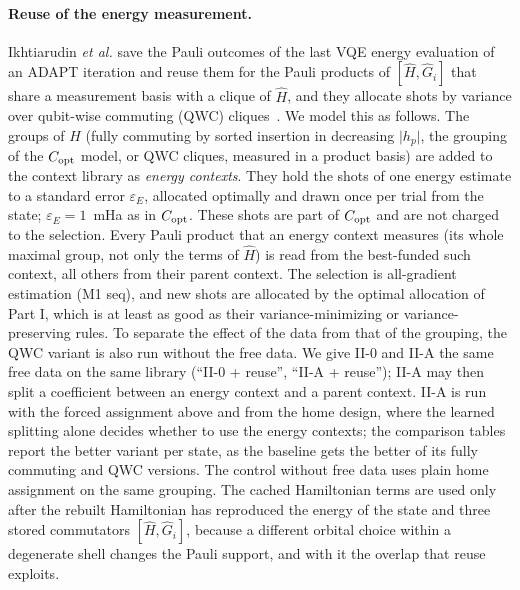 \documentclass[aps,pra,reprint,superscriptaddress,nofootinbib]{revtex4-2}
\begin{document}
\paragraph{Reuse of the energy measurement.} Ikhtiarudin \textit{et al.} save the Pauli outcomes of the last VQE energy evaluation of an ADAPT iteration and reuse them for the Pauli products of $[\hat H,\hat G_i]$ that share a measurement basis with a clique of $\hat H$, and they allocate shots by variance over qubit-wise commuting (QWC) cliques~\cite{ikhtiarudin2025}. We model this as follows. The groups of $\hat H$ (fully commuting by sorted insertion in decreasing $\lvert h_p\rvert$, the grouping of the $C_{\rm opt}$ model, or QWC cliques, measured in a product basis) are added to the context library as \emph{energy contexts}. They hold the shots of one energy estimate to a standard error $\varepsilon_E$, allocated optimally and drawn once per trial from the state; $\varepsilon_E=1$~mHa as in $C_{\rm opt}$. These shots are part of $C_{\rm opt}$ and are not charged to the selection. Every Pauli product that an energy context measures (its whole maximal group, not only the terms of $\hat H$) is read from the best-funded such context, all others from their parent context. The selection is all-gradient estimation (M1 seq), and new shots are allocated by the optimal allocation of Part I, which is at least as good as their variance-minimizing or variance-preserving rules. To separate the effect of the data from that of the grouping, the QWC variant is also run without the free data. We give II-0 and II-A the same free data on the same library (``II-0 + reuse'', ``II-A + reuse''); II-A may then split a coefficient between an energy context and a parent context. II-A is run with the forced assignment above and from the home design, where the learned splitting alone decides whether to use the energy contexts; the comparison tables report the better variant per state, as the baseline gets the better of its fully commuting and QWC versions. The control without free data uses plain home assignment on the same grouping. The cached Hamiltonian terms are used only after the rebuilt Hamiltonian has reproduced the energy of the state and three stored commutators $[\hat H,\hat G_i]$, because a different orbital choice within a degenerate shell changes the Pauli support, and with it the overlap that reuse exploits.
\end{document}
